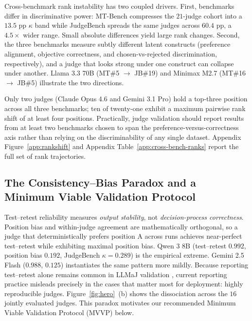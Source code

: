 \documentclass[11pt]{article}
\begin{document}
Cross-benchmark rank instability has two coupled drivers. First, benchmarks differ in discriminative power: MT-Bench compresses the $21$-judge cohort into a $13.5$ pp $\kappa$ band while JudgeBench spreads the same judges across $60.4$ pp, a $4.5\times$ wider range. Small absolute differences yield large rank changes. Second, the three benchmarks measure subtly different latent constructs (preference alignment, objective correctness, and chosen-vs-rejected discrimination, respectively), and a judge that looks strong under one construct can collapse under another. Llama 3.3 70B (MT$\#$5 $\to$ JB$\#$19) and Minimax M2.7 (MT$\#$16 $\to$ JB$\#$5) illustrate the two directions.

Only two judges (Claude Opus 4.6 and Gemini 3.1 Pro) hold a top-three position across all three benchmarks; ten of twenty-one exhibit a maximum pairwise rank shift of at least four positions. Practically, judge validation should report results from at least two benchmarks chosen to span the preference-versus-correctness axis rather than relying on the discriminability of any single dataset. Appendix Figure~\ref{app:rankshift} and Appendix Table~\ref{app:cross-bench-ranks} report the full set of rank trajectories.

\subsection{The Consistency--Bias Paradox and a Minimum Viable Validation Protocol}


Test--retest reliability measures \emph{output stability}, not \emph{decision-process correctness}. Position bias and within-judge agreement are mathematically orthogonal, so a judge that deterministically prefers position A across runs achieves near-perfect test--retest while exhibiting maximal position bias. Qwen 3 8B (test--retest $0.992$, position bias $0.192$, JudgeBench $\kappa = 0.289$) is the empirical extreme. Gemini 2.5 Flash ($0.988$, $0.125$) instantiates the same pattern more mildly. Because reporting test--retest alone remains common in LLMaJ validation \citep{stureborg2024large,schroeder2024trust}, current reporting practice misleads precisely in the cases that matter most for deployment: highly reproducible judges. Figure~\ref{fig:hero}~(b) shows the dissociation across the $16$ jointly evaluated judges. This paradox motivates our recommended Minimum Viable Validation Protocol (MVVP) below.
\end{document}
